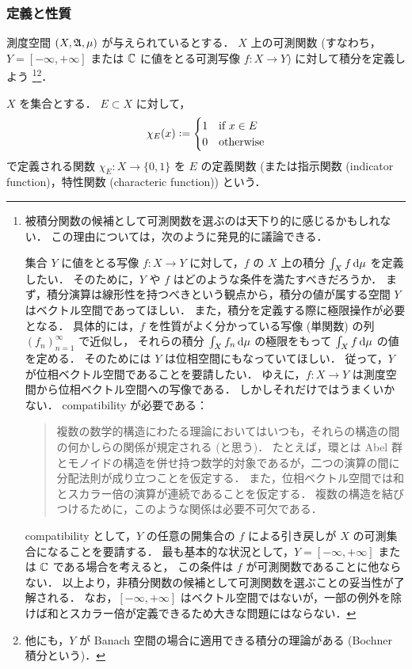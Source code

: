 \subsubsection{定義と性質}

測度空間 $(X,\mathfrak{A},\mu)$ が与えられているとする．
$X$ 上の可測関数 (すなわち，$Y=[-\infty,+\infty]$ または $\mathbb{C}$ に値をとる可測写像 $f:X\to Y$) に対して積分を定義しよう
\footnote{
    被積分関数の候補として可測関数を選ぶのは天下り的に感じるかもしれない．
    この理由については，次のように発見的に議論できる．

    集合 $Y$ に値をとる写像 $f:X\to Y$ に対して，$f$ の $X$ 上の積分 $\int_Xf\,\mathrm{d}\mu$ を定義したい．
    そのために，$Y$ や $f$ はどのような条件を満たすべきだろうか．
    まず，積分演算は線形性を持つべきという観点から，積分の値が属する空間 $Y$ はベクトル空間であってほしい．
    また，積分を定義する際に極限操作が必要となる．
    具体的には，$f$ を性質がよく分かっている写像 (単関数) の列 $(f_n)_{n=1}^\infty$ で近似し，
    それらの積分 $\int_X f_n\,\mathrm{d}\mu$ の極限をもって $\int_Xf\,\mathrm{d}\mu$ の値を定める．
    そのためには $Y$ は位相空間にもなっていてほしい．
    従って，$Y$ が位相ベクトル空間であることを要請したい．
    ゆえに，$f:X\to Y$ は測度空間から位相ベクトル空間への写像である．
    しかしそれだけではうまくいかない．
    compatibility が必要である：
    \begin{quote}
        複数の数学的構造にわたる理論においてはいつも，それらの構造の間の何かしらの関係が規定される (と思う)．
        たとえば，環とは Abel 群とモノイドの構造を併せ持つ数学的対象であるが，二つの演算の間に分配法則が成り立つことを仮定する．
        また，位相ベクトル空間では和とスカラー倍の演算が連続であることを仮定する．
        複数の構造を結びつけるために，このような関係は必要不可欠である．
    \end{quote}
    compatibility として，$Y$ の任意の開集合の $f$ による引き戻しが $X$ の可測集合になることを要請する．
    最も基本的な状況として，$Y=[-\infty,+\infty]$ または $\mathbb{C}$ である場合を考えると，
    この条件は $f$ が可測関数であることに他ならない．
    以上より，非積分関数の候補として可測関数を選ぶことの妥当性が了解される．
    なお，$[-\infty,+\infty]$ はベクトル空間ではないが，一部の例外を除けば和とスカラー倍が定義できるため大きな問題にはならない．
}\footnote{
    他にも，$Y$ が Banach 空間の場合に適用できる積分の理論がある (Bochner 積分という)．
}．

\begin{definition}
    $X$ を集合とする．
    $E\subset X$ に対して，
    \begin{align*}
        \chi_E(x)\defeq\begin{cases}
            1&\text{if $x\in E$}\\
            0&\text{otherwise}
        \end{cases}
    \end{align*}
    で定義される関数 $\chi_E:X\to\{0,1\}$ を $E$ の定義関数
    (または指示関数 (indicator function)，特性関数 (characteric function)) という．
\end{definition}

